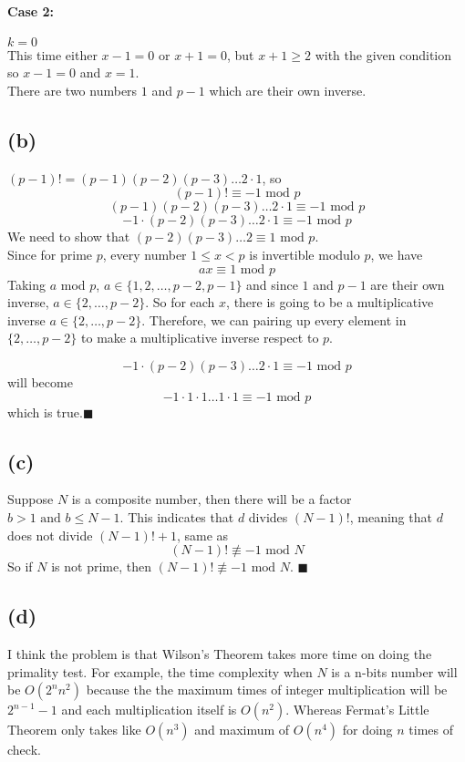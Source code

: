 \documentclass{article}
\begin{document}
\paragraph{Case 2:} $k = 0$\\
This time either $x-1 = 0$ or $x+1 = 0$, but $x+1 \geq 2$ with the given condition so $x - 1 = 0$ and $x= 1$.
\\
There are two numbers $1$ and $p-1$ which are their own inverse.

\subsection*{(b)}
$(p-1)! = (p-1)(p-2)(p-3)\dots 2 \cdot 1$, so
    $$(p-1)! \equiv -1 \mbox{ mod } p$$
    $$(p-1)(p-2)(p-3)\dots 2 \cdot 1 \equiv -1 \mbox{ mod } p$$
    $$-1 \cdot (p-2)(p-3)\dots 2 \cdot 1 \equiv -1 \mbox{ mod } p $$
We need to show that  $(p-2)(p-3) \ldots 2 \equiv 1 \mbox{ mod } p$.\\
Since for prime $p$, every number $1 \leq x < p$ is invertible modulo $p$, we have 
$$ax \equiv 1 \mbox{ mod } p $$
Taking $a$ mod $p$, $a \in \{1,2,\dots, p-2,p-1\}$ and since $1$ and $p-1$ are their own inverse, $a \in \{2,\dots,p-2\}$.
So for each $x$, there is going to be a multiplicative inverse $a \in \{2,\dots,p-2\}$. Therefore, we can pairing up every element in $ \{2,\dots,p-2\}$ to make a multiplicative inverse respect to $p$.

$$-1 \cdot (p-2)(p-3)\dots 2 \cdot 1 \equiv -1 \mbox{ mod } p $$
will become
$$-1 \cdot 1 \cdot 1 \dots 1 \cdot 1 \equiv -1 \mbox{ mod } p $$
which is true.$\blacksquare$

\subsection*{(c)}
Suppose $N$ is a composite number, then there will be a factor $b > 1 \mbox{ and } b \leq N-1$. This indicates that $d$ divides $(N-1)!$, meaning that $d$ does not divide $(N-1)! + 1$, same as
$$(N-1)! \not\equiv -1 \mbox{ mod } N$$
So if $N$ is not prime, then  $(N-1)! \not\equiv -1 \mbox{ mod } N$. $\blacksquare$


\subsection*{(d)}
I think the problem is that Wilson's Theorem takes more time on doing the primality test. 
For example, the time complexity when $N$ is a n-bits number will be $O(2^nn^2)$ because the the maximum times of integer multiplication will be $2^{n-1}-1$ and each multiplication itself is $O(n^2)$. Whereas 
Fermat's Little Theorem only takes like $O(n^3)$ and maximum of $O(n^4)$ for doing $n$ times of check.
\end{document}
